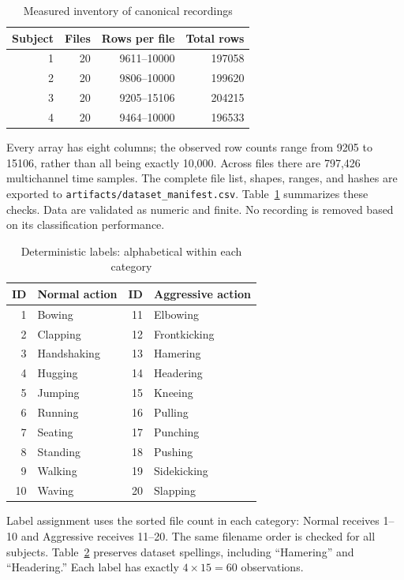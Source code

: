 \documentclass[journal]{IEEEtran}
\begin{document}
\begin{table}[t]
\caption{Measured inventory of canonical recordings}
\label{tab:inventory}\centering\small
\begin{tabular}{rrrr}\toprule
Subject & Files & Rows per file & Total rows\\\midrule
1 & 20 & 9611--10000 & 197058 \\
2 & 20 & 9806--10000 & 199620 \\
3 & 20 & 9205--15106 & 204215 \\
4 & 20 & 9464--10000 & 196533 \\
\bottomrule\end{tabular}
\end{table}

Every array has eight columns; the observed row counts range from 9205 to 15106, rather than all being exactly 10,000. Across files there are 797,426 multichannel time samples. The complete file list, shapes, ranges, and hashes are exported to \texttt{artifacts/dataset\_manifest.csv}. Table~\ref{tab:inventory} summarizes these checks. Data are validated as numeric and finite. No recording is removed based on its classification performance.

\begin{table}[t]
\caption{Deterministic labels: alphabetical within each category}
\label{tab:labels}\centering\small
\begin{tabular}{rlrl}\toprule
ID & Normal action & ID & Aggressive action\\\midrule
1 & Bowing & 11 & Elbowing \\
2 & Clapping & 12 & Frontkicking \\
3 & Handshaking & 13 & Hamering \\
4 & Hugging & 14 & Headering \\
5 & Jumping & 15 & Kneeing \\
6 & Running & 16 & Pulling \\
7 & Seating & 17 & Punching \\
8 & Standing & 18 & Pushing \\
9 & Walking & 19 & Sidekicking \\
10 & Waving & 20 & Slapping \\
\bottomrule\end{tabular}
\end{table}

Label assignment uses the sorted file count in each category: Normal receives 1--10 and Aggressive receives 11--20. The same filename order is checked for all subjects. Table~\ref{tab:labels} preserves dataset spellings, including ``Hamering'' and ``Headering.'' Each label has exactly $4\times15=60$ observations.
\end{document}
